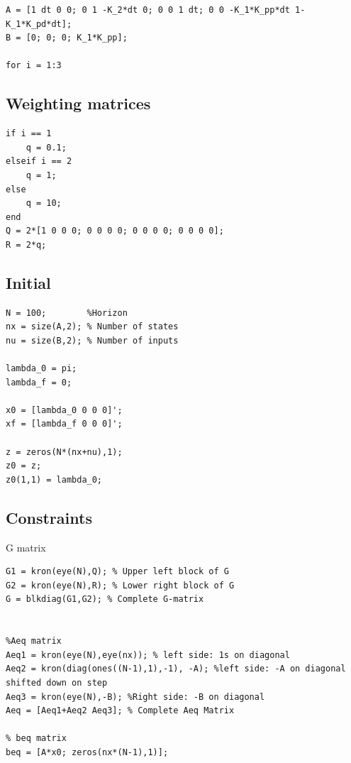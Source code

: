 \documentclass[11pt,a4paper,USenglish]{article} %
\begin{document}
\begin{verbatim}
A = [1 dt 0 0; 0 1 -K_2*dt 0; 0 0 1 dt; 0 0 -K_1*K_pp*dt 1-K_1*K_pd*dt];
B = [0; 0; 0; K_1*K_pp];

for i = 1:3
\end{verbatim}


\subsection*{Weighting matrices}

\begin{verbatim}
if i == 1
    q = 0.1;
elseif i == 2
    q = 1;
else
    q = 10;
end
Q = 2*[1 0 0 0; 0 0 0 0; 0 0 0 0; 0 0 0 0];
R = 2*q;
\end{verbatim}


\subsection*{Initial}

\begin{verbatim}
N = 100;        %Horizon
nx = size(A,2); % Number of states
nu = size(B,2); % Number of inputs

lambda_0 = pi;
lambda_f = 0;

x0 = [lambda_0 0 0 0]';
xf = [lambda_f 0 0 0]';

z = zeros(N*(nx+nu),1);
z0 = z;
z0(1,1) = lambda_0;
\end{verbatim}


\subsection*{Constraints}

\begin{par}
G matrix
\end{par} \vspace{1em}
\begin{verbatim}
G1 = kron(eye(N),Q); % Upper left block of G
G2 = kron(eye(N),R); % Lower right block of G
G = blkdiag(G1,G2); % Complete G-matrix


%Aeq matrix
Aeq1 = kron(eye(N),eye(nx)); % left side: 1s on diagonal
Aeq2 = kron(diag(ones((N-1),1),-1), -A); %left side: -A on diagonal shifted down on step
Aeq3 = kron(eye(N),-B); %Right side: -B on diagonal
Aeq = [Aeq1+Aeq2 Aeq3]; % Complete Aeq Matrix

% beq matrix
beq = [A*x0; zeros(nx*(N-1),1)];
\end{verbatim}
\end{document}

